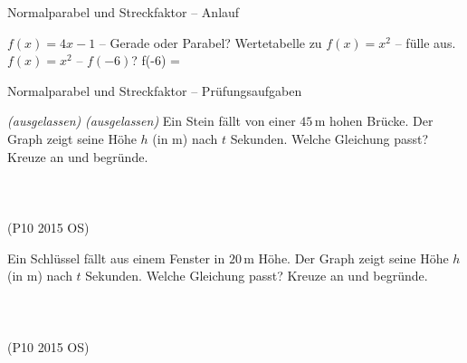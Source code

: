 \setcounter{aufgabe}{10}

\begin{aufgabe}{Normalparabel und Streckfaktor – Anlauf}
\begin{teile}
\teil $f(x) = 4x - 1$ – Gerade oder Parabel?  
\teil Wertetabelle zu $f(x) = x^2$ – fülle aus.
\teil $f(x) = x^2$ – $f(-6)$? f(-6) = \leerfeld
\end{teile}
\end{aufgabe}

\begin{aufgabe}{Normalparabel und Streckfaktor – Prüfungsaufgaben}
\begin{teile}
\teil \textit{(ausgelassen)}
\teil \textit{(ausgelassen)}
\steil Ein Stein fällt von einer $45\,$m hohen Brücke. Der Graph zeigt seine Höhe $h$ (in m) nach $t$ Sekunden. Welche Gleichung passt? Kreuze an und begründe. \\  \\  \\  \\  \hfill (P10 2015 OS)

\begin{ksys}[xmin=0,xmax=4,ymin=0,ymax=50,xstep=0.5,ystep=5,xlabel=$t$ in s,ylabel=$h$ in m,ablesen]
\end{ksys}
\steil Ein Schlüssel fällt aus einem Fenster in $20\,$m Höhe. Der Graph zeigt seine Höhe $h$ (in m) nach $t$ Sekunden. Welche Gleichung passt? Kreuze an und begründe. \\  \\  \\  \\  \hfill (P10 2015 OS)


\end{teile}
\end{aufgabe}
